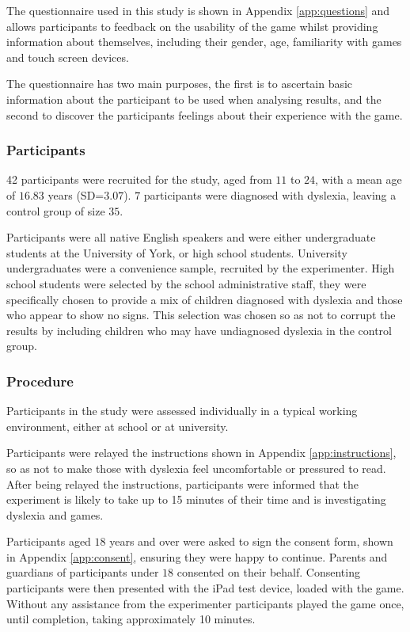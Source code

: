 \documentclass[journal]{IEEEtran}
\begin{document}
The questionnaire used in this study is shown in Appendix \ref{app:questions} and allows participants to feedback on the usability of the game whilst providing information about themselves, including their gender, age, familiarity with games and touch screen devices.

The questionnaire has two main purposes, the first is to ascertain basic information about the participant to be used when analysing results, and the second to discover the participants feelings about their experience with the game.

\subsubsection{Participants}
42 participants were recruited for the study, aged from $11$ to $24$, with a mean age of $16.83$ years (SD=$3.07$). $7$ participants were diagnosed with dyslexia, leaving a control group of size $35$. 

Participants were all native English speakers and were either undergraduate students at the University of York, or high school students. University undergraduates were a convenience sample, recruited by the experimenter.
High school students were selected by the school administrative staff, they were specifically chosen to provide a mix of children diagnosed with dyslexia and those who appear to show no signs. This selection was chosen so as not to corrupt the results by including children who may have undiagnosed dyslexia in the control group.

\subsubsection{Procedure}
Participants in the study were assessed individually in a typical working environment, either at school or at university. 

Participants were relayed the instructions shown in Appendix \ref{app:instructions}, so as not to make those with dyslexia feel uncomfortable or pressured to read. 
After being relayed the instructions, participants were informed that the experiment is likely to take up to 15 minutes of their time and is investigating dyslexia and games. 

Participants aged $18$ years and over were asked to sign the consent form, shown in Appendix \ref{app:consent}, ensuring they were happy to continue. Parents and guardians of participants under $18$ consented on their behalf. 
Consenting participants were then presented with the iPad test device, loaded with the game. Without any assistance from the experimenter participants played the game once, until completion, taking approximately 10 minutes. 
\end{document}
